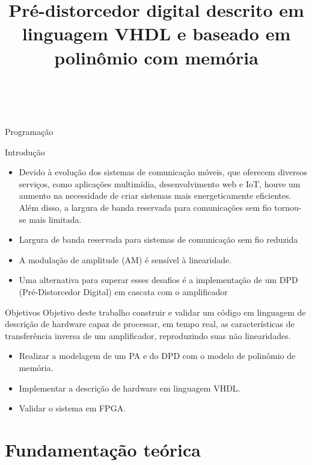 \documentclass{if-beamer}
\title[Pré-distorcedor digital descrito em linguagem VHDL e baseado em polinômio com memória.]{\textbf{Pré-distorcedor digital descrito em linguagem VHDL e baseado em polinômio com memória}}
\subtitle{}
\author[Leonardo de Andrade Santos]{\large \negrito{Leonardo de Andrade Santos} \\ \negrito{Sibilla Batista da Luz França}}
\institute[UFPR/PR]{
    \small \textit{Universidade Federal do Paraná} \\
}
\date{\the\year}
\begin{document}
\begin{frame}
  \titlepage
\end{frame}

\begin{frame}{Programação}
  \tableofcontents
\end{frame}

\begin{frame}{Introdução}
\begin{itemize}
	\item Devido à evolução dos sistemas de comunicação móveis, que oferecem diversos serviços, como aplicações multimídia, desenvolvimento web e IoT, houve um aumento na necessidade de criar sistemas mais energeticamente eficientes. Além disso, a largura de banda reservada para comunicações sem fio tornou-se mais limitada.
	\item Largura de banda reservada para sistemas de comunicação sem fio reduzida
	\item A modulação de amplitude (AM) é sensível à linearidade.
	\item Uma alternativa para superar esses desafios é a implementação de um DPD (Pré-Distorcedor Digital) em cascata com o amplificador
\end{itemize}
\end{frame}

\begin{frame}{Objetivos}
	Objetivo deste trabalho construir e validar um código em linguagem de descrição de hardware capaz de processar, em tempo real, as características de transferência inversa de um amplificador, reproduzindo suas não linearidades.
	\begin{itemize}
		\item Realizar a modelagem de um PA e do DPD com o modelo de polinômio de memória.
		\item Implementar a descrição de hardware em linguagem VHDL.
		\item Validar o sistema em FPGA.
	\end{itemize}
\end{frame}



\section{Fundamentação teórica}
\end{document}
